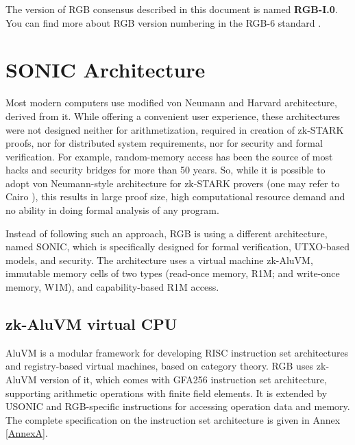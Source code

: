 \documentclass[9pt,oneside]{amsart}
\begin{document}
\begin{multicols}{2}
The version of RGB consensus described in this document is named \textbf{RGB-I.0}.
You can find more about RGB version numbering in the RGB-6 standard \cite{RGB6}.

\section{SONIC Architecture}

Most modern computers use modified von Neumann and Harvard architecture, derived from it.
While offering a convenient user experience, these architectures were not designed neither for
arithmetization, required in creation of zk-STARK proofs, nor for distributed system requirements,
nor for security and formal verification. For example, random-memory access has been the source
of most hacks and security bridges for more than 50 years.
So, while it is possible to adopt von Neumann-style architecture for zk-STARK provers
(one may refer to Cairo \cite{Cairo}), this results in large proof size, high computational resource demand
and no ability in doing formal analysis of any program.

Instead of following such an approach, RGB is using a different architecture, named SONIC,
which is specifically designed for formal verification, UTXO-based models, and security.
The architecture uses a virtual machine zk-AluVM, immutable memory cells of two types
(read-once memory, R1M; and write-once memory, W1M), and capability-based R1M access.

\subsection{zk-AluVM virtual CPU}\label{AluVM}

AluVM \cite{AluVM} is a modular framework for developing RISC instruction set architectures and registry-based
virtual machines, based on category theory. RGB uses zk-AluVM version of it, 
which comes with GFA256 instruction set architecture, supporting arithmetic operations with
finite field elements. It is extended by USONIC and RGB-specific instructions
for accessing operation data and memory.
The complete specification on the instruction set architecture is given in Annex \ref{AnnexA}.

\end{multicols}
\end{document}
